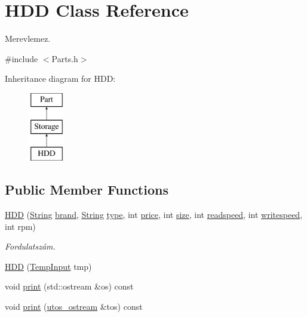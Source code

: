 \hypertarget{class_h_d_d}{}\section{H\+DD Class Reference}
\label{class_h_d_d}


Merevlemez.  




{\ttfamily \#include $<$Parts.\+h$>$}

Inheritance diagram for H\+DD\+:\begin{figure}[H]
\begin{center}
\leavevmode
\includegraphics[height=3.000000cm]{class_h_d_d}
\end{center}
\end{figure}
\subsection*{Public Member Functions}
\begin{DoxyCompactItemize}
\item 
\mbox{\hyperlink{class_h_d_d_a375ad923cb64a11afc261fe1fac5276c}{H\+DD}} (\mbox{\hyperlink{class_string}{String}} \mbox{\hyperlink{class_part_ae06f2fdeb7fbbdb229a7aca151f3e341}{brand}}, \mbox{\hyperlink{class_string}{String}} \mbox{\hyperlink{class_part_a101dbcc5c4b21564df7414c7eb0eae88}{type}}, int \mbox{\hyperlink{class_part_a8e71223aed1da95a974f33d8d6c91bb1}{price}}, int \mbox{\hyperlink{class_storage_abcc80ce58a21fa884035617ee0b6cb67}{size}}, int \mbox{\hyperlink{class_storage_a41073842ff16961dad3903e6dd49bb0c}{readspeed}}, int \mbox{\hyperlink{class_storage_a0198a1483ccf849d48c76da88599ba8b}{writespeed}}, int rpm)
\begin{DoxyCompactList}\small\item\em Fordulatszám. \end{DoxyCompactList}\item 
\mbox{\hyperlink{class_h_d_d_a98374b087d6a74476b914dedb2de1ec4}{H\+DD}} (\mbox{\hyperlink{struct_temp_input}{Temp\+Input}} tmp)
\item 
void \mbox{\hyperlink{class_h_d_d_a07c34356018542934a4dd91ce38b0821}{print}} (std\+::ostream \&os) const
\item 
void \mbox{\hyperlink{class_h_d_d_aca2c2583fa3304917905cd9185b64539}{print}} (\mbox{\hyperlink{structutos__ostream}{utos\+\_\+ostream}} \&tos) const
\end{DoxyCompactItemize}
